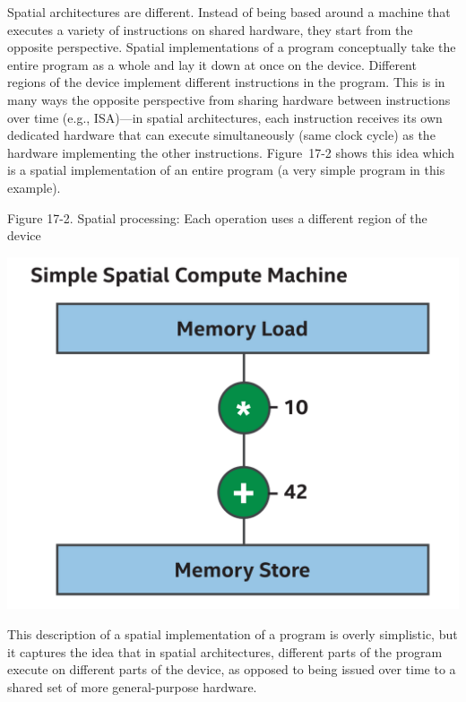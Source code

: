 Spatial architectures are different. Instead of being based around a machine that executes a variety of instructions on shared hardware, they start from the opposite perspective. Spatial implementations of a program conceptually take the entire program as a whole and lay it down at once on the device. Different regions of the device implement different instructions in the program. This is in many ways the opposite perspective from sharing hardware between instructions over time (e.g., ISA)—in spatial architectures, each instruction receives its own dedicated hardware that can execute simultaneously (same clock cycle) as the hardware implementing the other instructions. Figure 17-2 shows this idea which is a spatial implementation of an entire program (a very simple program in this example).\par

\hspace*{\fill} \par %
Figure 17-2. Spatial processing: Each operation uses a different region of the device
\begin{center}
	\includegraphics[width=1.0\textwidth]{content/chapter-17/images/3}
\end{center}

This description of a spatial implementation of a program is overly simplistic, but it captures the idea that in spatial architectures, different parts of the program execute on different parts of the device, as opposed to being issued over time to a shared set of more general-purpose hardware.\par

